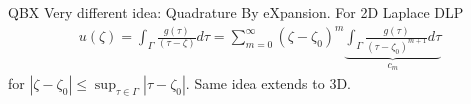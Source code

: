 \documentclass[t]{beamer}
\begin{document}
\begin{noframe}{QBX}
  Very different idea: Quadrature By eXpansion. For 2D Laplace DLP
  \begin{align}
    u(\zeta) = 
    \int_\Gamma \frac{g(\tau)}{(\tau-\zeta)} d\tau =
    \sum_{m=0}^\infty (\zeta-\zeta_0)^m
    \underbrace{
    \int_\Gamma \frac{g(\tau)}{(\tau-\zeta_0)^{m+1}} d\tau
    }_{c_m}
  \end{align}
  for $|\zeta-\zeta_0| \le \sup_{\tau\in\Gamma} |\tau-\zeta_0|$. Same idea extends to 3D.
  \begin{columns}
    \begin{column}{0.5\textwidth}
\end{column}
\end{columns}
\end{noframe}
\end{document}

